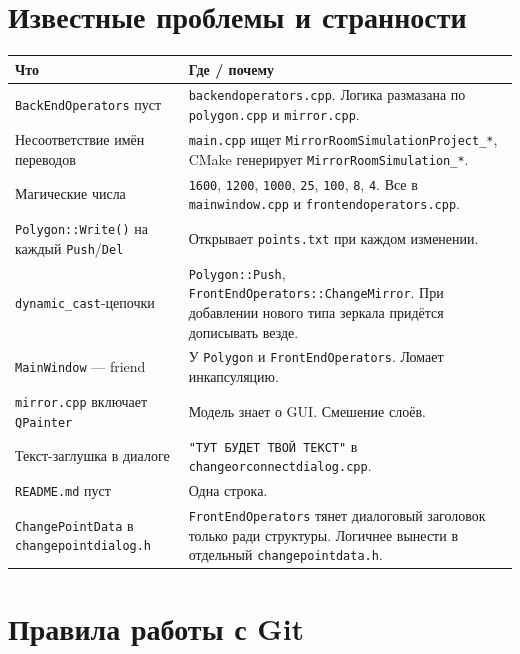 \documentclass[a4paper,11pt]{article}
\newcommand{\file}[1]{\texttt{#1}}
\newcommand{\code}[1]{\texttt{#1}}
\begin{document}
\section{Известные проблемы и странности}
\label{sec:known-issues}

\begin{longtable}{@{}p{6.5cm}p{8cm}@{}}
\toprule
\textbf{Что} & \textbf{Где / почему} \\ \midrule
\endhead
\code{BackEndOperators} пуст &
\file{backendoperators.cpp}. Логика размазана по \file{polygon.cpp}
и \file{mirror.cpp}. \\
\addlinespace
Несоответствие имён переводов &
\file{main.cpp} ищет \code{MirrorRoomSimulationProject\_*},
CMake генерирует \code{MirrorRoomSimulation\_*}. \\
\addlinespace
Магические числа &
\code{1600}, \code{1200}, \code{1000}, \code{25}, \code{100},
\code{8}, \code{4}. Все в \file{mainwindow.cpp} и
\file{frontendoperators.cpp}. \\
\addlinespace
\code{Polygon::Write()} на каждый \code{Push}/\code{Del} &
Открывает \file{points.txt} при каждом изменении. \\
\addlinespace
\code{dynamic\_cast}-цепочки &
\code{Polygon::Push}, \code{FrontEndOperators::ChangeMirror}. При
добавлении нового типа зеркала придётся дописывать везде. \\
\addlinespace
\code{MainWindow} — friend & У \code{Polygon} и
\code{FrontEndOperators}. Ломает инкапсуляцию. \\
\addlinespace
\code{mirror.cpp} включает \code{QPainter} &
Модель знает о GUI. Смешение слоёв. \\
\addlinespace
Текст-заглушка в диалоге &
\code{"ТУТ БУДЕТ ТВОЙ ТЕКСТ"} в
\file{changeorconnectdialog.cpp}. \\
\addlinespace
\file{README.md} пуст & Одна строка. \\
\addlinespace
\code{ChangePointData} в \file{changepointdialog.h} &
\code{FrontEndOperators} тянет диалоговый заголовок только ради
структуры. Логичнее вынести в отдельный \file{changepointdata.h}. \\
\bottomrule
\end{longtable}

\section{Правила работы с Git}
\label{sec:git}
\end{document}

